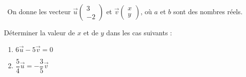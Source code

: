 \documentclass[
	classe=$2^{de}$,
	landscape,
	twocolumn,
]{évaluation}
\begin{document}
\begin{exercice}\
	On donne les vecteur $\vec{u} \begin{pmatrix}3 \\ -2\end{pmatrix}$ et $\vec{v} \begin{pmatrix}x \\ y\end{pmatrix}$, où $a$ et $b$ sont des nombres réels.

	Déterminer la valeur de $x$ et de $y$ dans les cas suivants :
	\begin{enumerate}
		\setlength{\itemsep}{1.5em}
		\item $6\vec{u} - 5\vec{v} = 0$
		\item $\dfrac{5}{4}\vec{u} = -\dfrac{3}{5}\vec{v}$
	\end{enumerate}
\end{exercice}
\end{document}
